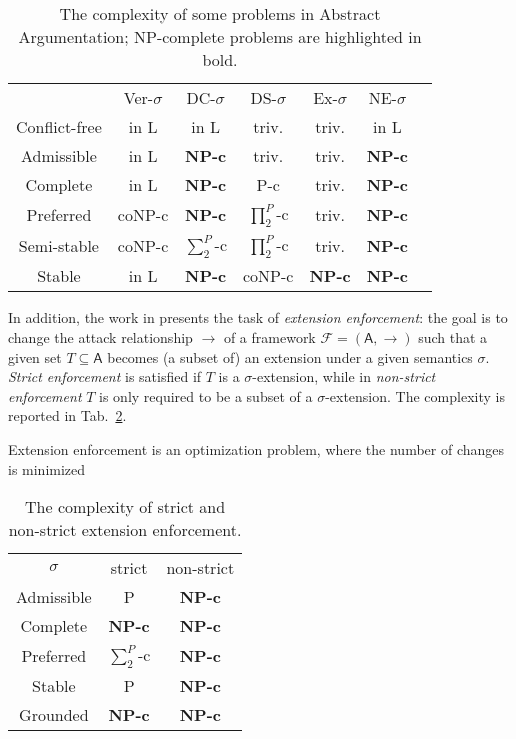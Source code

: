 \documentclass[conference]{IEEEtran}
\newcommand{\F}{\ensuremath{\mathcal{F}}\xspace} %
\newcommand{\args}{\ensuremath{\mathsf{A}}\xspace} %
\newcommand{\atts}{\ensuremath{\rightarrow}\xspace}
\begin{document}
\begin{table}[t]
	\centering
	\footnotesize
	\begin{tabular}{ccccccc}
		&  Ver-$\sigma$ &  DC-$\sigma$ & DS-$\sigma$ & Ex-$\sigma$ &
		NE-$\sigma$  \\
		Conflict-free & in L & in L & triv.& triv. & in L  \\
		Admissible & in L  & \bf{NP-c} & triv. & triv. &  \bf{NP-c}  \\
		Complete & in L &  \bf{NP-c} & P-c & triv. &  \bf{NP-c}  \\
		Preferred & coNP-c &  \bf{NP-c} & $\prod^{P}_{2}$-c& triv. &  \bf{NP-c} \\
		Semi-stable & coNP-c & $\sum^{P}_{2}$-c & $\prod^{P}_{2}$-c & triv. &  \bf{NP-c}  \\
		Stable & in L &  \bf{NP-c} & coNP-c &  \bf{NP-c} &  \bf{NP-c} \\
	\end{tabular}
	\caption{The complexity of some  problems in Abstract Argumentation; NP-complete problems are highlighted in bold.}
	\label{sec:complexity}
	\vspace{-0.5cm}
\end{table}

In addition, the work in \cite{extenf} presents the task of \emph{extension enforcement}: the goal is to change the attack relationship $\atts$ of a framework $\F=(\args,\atts)$ such that a given set $T \subseteq \args$ becomes (a subset of) an extension under a given semantics $\sigma$. \emph{Strict enforcement} is satisfied if $T$ is a $\sigma$-extension, while in \emph{non-strict enforcement} $T$ is only required to be a subset of a $\sigma$-extension. The complexity is reported in Tab.~\ref{sec:complexity2}.

\begin{definition}
Extension enforcement is an optimization problem, where the number of changes is minimized
\end{definition}

\begin{table}[t]
	\centering
	\footnotesize
	\begin{tabular}{ccc}
		$\sigma$ &  strict & non-strict  \\
		Admissible & P  & \bf{NP-c}   \\
		Complete & \bf{NP-c} &  \bf{NP-c}  \\
		Preferred & $\sum^{P}_{2}$-c  &  \bf{NP-c}  \\
		Stable &  P & \bf{NP-c}  \\
		Grounded & \bf{NP-c} & \bf{NP-c}
	\end{tabular}
	\caption{The complexity of strict and non-strict extension enforcement.}
	\label{sec:complexity2}
	\vspace{-0.5cm}
\end{table}
\end{document}
